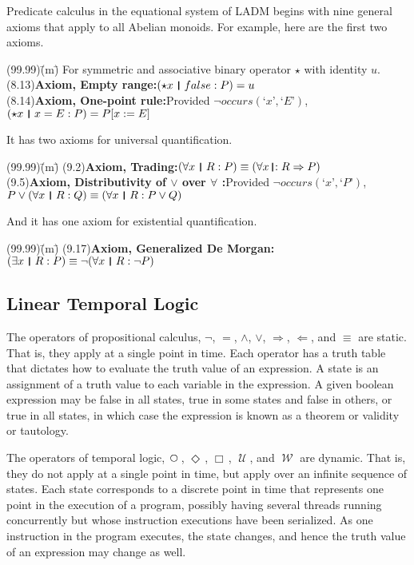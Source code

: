 \documentclass[12pt, fleqn, leqno]{article}
\newcommand{\lgap}{2pt}                             %
\newcommand{\impl}{\ensuremath{\Rightarrow}}        %
\newcommand{\foll}{\ensuremath{\Leftarrow}}         %
\newcommand{\Until}{\;\mathcal{U}\;}
\newcommand{\Wait}{\;\mathcal{W}\;}
\newcommand{\Next}{\;\,\text{\raisebox{3.5pt}{\circle{6}}}}
\newcommand{\Event}{\Diamond\,}
\newcommand{\Always}{\Box\,}
\newcommand{\thedr}{\rule[-.25ex]{.32mm}{1.75ex}}   %
\newcommand{\dr}{\;\,\thedr\,\;}                    %
\newcommand{\rb}{:}                                 %
\newcommand{\drrb}{\;\thedr\,{:}\;}                 %
\newcommand{\all}{\forall}                          %
\newcommand{\ext}{\exists}                          %
\newcommand{\Lq}{\mbox{`}}
\newcommand{\Rq}{\mbox{'}}
\begin{document}
Predicate calculus in the equational system of LADM begins with nine general axioms that apply to all Abelian monoids.
For example, here are the first two axioms.
\begin{tabbing}
(99.99)\;\=(m)\;\=\kill
For symmetric and associative binary operator $\star$ with identity $u$.\\[\lgap]
(8.13)\>\textbf{Axiom, Empty range:}\quad $(\star x \dr false \rb P) =u$\\[\lgap]
(8.14)\>\textbf{Axiom, One-point rule:}\quad Provided $\neg occurs(\Lq x\Rq ,\Lq E\Rq)$,\\[\lgap]
      \>$(\star x\dr x=E\rb P) = P[x:=E]$
\end{tabbing}
It has two axioms for universal quantification.
\begin{tabbing}
(99.99)\;\=(m)\;\=\kill
(9.2)\>\textbf{Axiom, Trading:}\quad $(\all x\dr R\rb P)\equiv (\all x\drrb R\impl P)$\\[\lgap]
(9.5)\>\textbf{Axiom, Distributivity of $\lor$ over $\all$ :}\quad Provided $\neg occurs(\Lq x\Rq ,\Lq P\Rq)$,\\[\lgap]
      \>$P\lor (\all x\dr R\rb Q)\equiv (\all x\dr R\rb P\lor Q)$
\end{tabbing}
And it has one axiom for existential quantification.
\begin{tabbing}
(99.99)\;\=(m)\;\=\kill
(9.17)\>\textbf{Axiom, Generalized De Morgan:}\quad $(\ext x\dr R\rb P)\equiv \neg (\all x\dr R\rb \neg P)$
\end{tabbing}

\subsection{Linear Temporal Logic}

The operators of propositional calculus, $\neg$, $=$, $\land$, $\lor$, $\impl$, $\foll$, and $\equiv$ are static.
That is, they apply at a single point in time.
Each operator has a truth table that dictates how to evaluate the truth value of an expression.
A state is an assignment of a truth value to each variable in the expression.
A given boolean expression may be false in all states, true in some states and false in others, or true in all states, in which case the expression is known as a theorem or validity or tautology.

The operators of temporal logic, $\Next$, $\Event$, $\Always$, $\Until$, and $\Wait$ are dynamic.
That is, they do not apply at a single point in time, but apply over an infinite sequence of states.
Each state corresponds to a discrete point in time that represents one point in the execution of a program,
possibly having several threads running concurrently but whose instruction executions have been serialized.
As one instruction in the program executes, the state changes, and hence the truth value of an expression may change as well.
\end{document}
